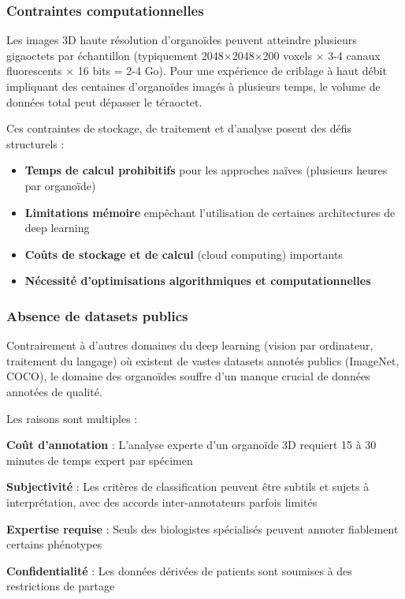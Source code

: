 \subsubsection{Contraintes computationnelles}

Les images 3D haute résolution d'organoïdes peuvent atteindre plusieurs gigaoctets par échantillon (typiquement 2048×2048×200 voxels × 3-4 canaux fluorescents × 16 bits = 2-4 Go). Pour une expérience de criblage à haut débit impliquant des centaines d'organoïdes imagés à plusieurs temps, le volume de données total peut dépasser le téraoctet.

Ces contraintes de stockage, de traitement et d'analyse posent des défis structurels :
\begin{itemize}
    \item \textbf{Temps de calcul prohibitifs} pour les approches naïves (plusieurs heures par organoïde)
    \item \textbf{Limitations mémoire} empêchant l'utilisation de certaines architectures de deep learning
    \item \textbf{Coûts de stockage et de calcul} (cloud computing) importants
    \item \textbf{Nécessité d'optimisations algorithmiques et computationnelles}
\end{itemize}

\subsubsection{Absence de datasets publics}

Contrairement à d'autres domaines du deep learning (vision par ordinateur, traitement du langage) où existent de vastes datasets annotés publics (ImageNet, COCO), le domaine des organoïdes souffre d'un manque crucial de données annotées de qualité.

Les raisons sont multiples :

\textbf{Coût d'annotation} : L'analyse experte d'un organoïde 3D requiert 15 à 30 minutes de temps expert par spécimen

\textbf{Subjectivité} : Les critères de classification peuvent être subtils et sujets à interprétation, avec des accords inter-annotateurs parfois limités
    
\textbf{Expertise requise} : Seuls des biologistes spécialisés peuvent annoter fiablement certains phénotypes

\textbf{Confidentialité} : Les données dérivées de patients sont soumises à des restrictions de partage

